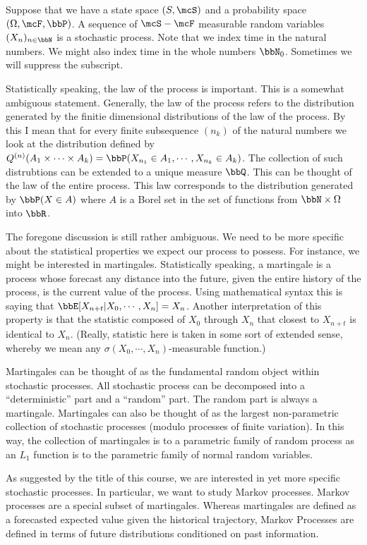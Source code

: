 \documentclass{report}
\begin{document}
Suppose that we have a state space $(S,\mcS)$ and a probability space $(\Omega, \mcF, \bbP)$.  A sequence of $\mcS-\mcF$ measurable random variables $(X_n)_{n \in \bbN}$ is a stochastic process.  Note that we index time in the natural numbers.  We might also index time in the whole numbers $\bbN_0$.  Sometimes we will suppress the subscript.

Statistically speaking, the law of the process is important.  This is a somewhat ambiguous statement.  Generally, the law of the process refers to the distribution generated by the finitie dimensional distributions of the law of the process.  By this I mean that for every finite subsequence $(n_k)$ of the natural numbers we look at the distribution defined by $Q^{(n)}(A_1 \times \cdots \times A_k) = \bbP(X_{n_1} \in A_1, \cdots, X_{n_k} \in A_k)$.  The collection of such distrubtions can be extended to a unique measure $\bbQ$.  This can be thought of the law of the entire process.  This law corresponds to the distribution generated by $\bbP(X \in A)$ where $A$ is a Borel set in the set of functions from $\bbN \times \Omega$ into $\bbR$.

The foregone discussion is still rather ambiguous.  We need to be more specific about the statistical properties we expect our process to possess.  For instance, we might be interested in martingales.  Statistically speaking, a martingale is a process whose forecast any distance into the future, given the entire history of the process, is the current value of the process.  Using mathematical syntax this is saying that $\bbE[X_{n+t} | X_0, \cdots, X_n ] = X_n$.  Another interpretation of this property is that the statistic composed of $X_0$ through $X_n$ that closest to $X_{n+t}$ is identical to $X_n$.  (Really, statistic here is taken in some sort of extended sense, whereby we mean any $\sigma(X_0, \cdots, X_n)$-measurable function.) 

Martingales can be thought of as the fundamental random object within stochastic processes.  All stochastic process can be decomposed into a ``deterministic'' part and a ``random'' part.  The random part is always a martingale.  Martingales can also be thought of as the largest non-parametric collection of stochastic processes (modulo processes of finite variation).  In this way, the collection of martingales is to a parametric family of random process as an $L_1$ function is to the parametric family of normal random variables.

As suggested by the title of this course, we are interested in yet more specific stochastic processes.  In particular, we want to study Markov processes.  Markov processes are a special subset of martingales.  Whereas martingales are defined as a forecasted expected value given the historical trajectory, Markov Processes are defined in terms of future distributions conditioned on past information.  
\end{document}
